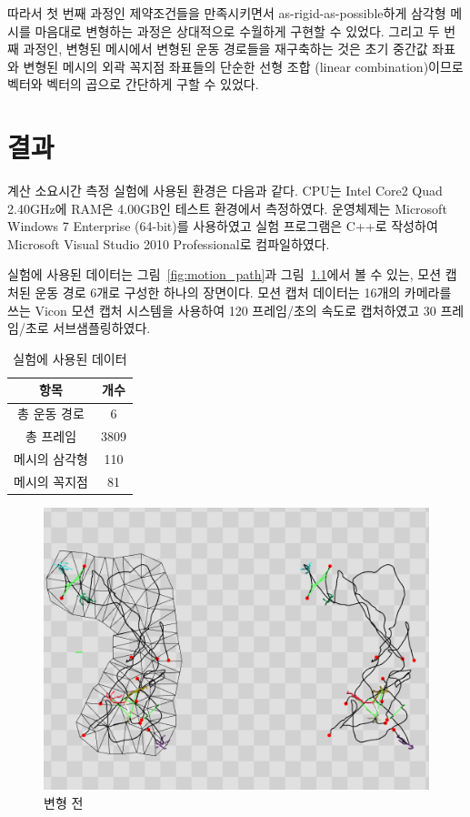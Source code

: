\documentclass[11pt,a4paper,oneside,draft]{report}
\begin{document}
따라서 첫 번째 과정인 제약조건들을 만족시키면서 as-rigid-as-possible하게 삼각형
메시를 마음대로 변형하는 과정은 상대적으로 수월하게 구현할 수 있었다. 그리고 두
번째 과정인, 변형된 메시에서 변형된 운동 경로들을 재구축하는 것은 초기 중간값
좌표와 변형된 메시의 외곽 꼭지점 좌표들의 단순한 선형 조합 (linear
combination)이므로 벡터와 벡터의 곱으로 간단하게 구할 수 있었다.

\chapter{결과}

계산 소요시간 측정 실험에 사용된 환경은 다음과 같다. CPU는 Intel Core2 Quad
2.40GHz에 RAM은 4.00GB인 테스트 환경에서 측정하였다. 운영체제는 Microsoft
Windows 7 Enterprise (64-bit)를 사용하였고 실험 프로그램은 C++로 작성하여
Microsoft Visual Studio 2010 Professional로 컴파일하였다.

실험에 사용된 데이터는 그림~\ref{fig:motion_path}과
그림~\ref{fig:before_deform}에서 볼 수 있는, 모션 캡처된 운동 경로 6개로 구성한
하나의 장면이다. 모션 캡처 데이터는 16개의 카메라를 쓰는 Vicon 모션 캡처
시스템을 사용하여 120 프레임/초의 속도로 캡처하였고 30 프레임/초로
서브샘플링하였다.

\begin{table}[ht]
\centering
\begin{tabular}{c|c}
\hline
항목 & 개수 \\
\hline
총 운동 경로 & 6 \\
총 프레임 & 3809 \\
메시의 삼각형 & 110 \\
메시의 꼭지점 & 81 \\
\hline
\end{tabular}
\caption{실험에 사용된 데이터}
\label{table:data}
\end{table}

\begin{figure}[p]
\centering
\includegraphics[width=0.9\linewidth]{before_deform_c.png}
\caption{변형 전}
\label{fig:before_deform}
\end{figure}
\end{document}
